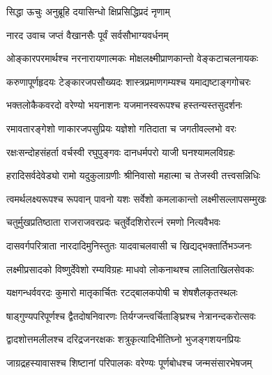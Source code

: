 

सिद्धा  ऊचुः\nopagebreak[4]
{अनुब्रूहि  दयासिन्धो  क्षिप्रसिद्धिप्रदं  नृणाम्}

नारद  उवाच
{जप्तं  वैखानसैः  पूर्वं  सर्वसौभाग्यवर्धनम्}

\twolineshloka
{ओङ्कारपरमार्थश्च  नरनारायणात्मकः}
{मोक्षलक्ष्मीप्राणकान्तो वेङ्कटाचलनायकः}

\twolineshloka
{करुणापूर्णहृदयः टेङ्कारजपसौख्यदः}
{शास्त्रप्रमाणगम्यश्च यमाद्यष्टाङ्गगोचरः}
    
\twolineshloka
{भक्तलोकैकवरदो वरेण्यो भयनाशनः}
{यजमानस्वरूपश्च हस्तन्यस्तसुदर्शनः}
        
\twolineshloka
{रमावतारङ्गेशो णाकारजपसुप्रियः}
{यज्ञेशो गतिदाता च जगतीवल्लभो वरः}
            
\twolineshloka
{रक्षःसन्दोहसंहर्ता वर्चस्वी रघुपुङ्गवः}
{दानधर्मपरो याजी घनश्यामलविग्रहः}
                
\twolineshloka
{हरादिसर्वदेवेड्यो रामो यदुकुलाग्रणीः}
{श्रीनिवासो महात्मा च तेजस्वी तत्त्वसन्निधिः}
                    
\twolineshloka
{त्वमर्थलक्ष्यरूपश्च रूपवान् पावनो यशः}
{सर्वेशो कमलाकान्तो लक्ष्मीसल्लापसम्मुखः}
                        
\twolineshloka
{चतुर्मुखप्रतिष्ठाता राजराजवरप्रदः}
{चतुर्वेदशिरोरत्नं रमणो नित्यवैभवः }
                            
\twolineshloka
{दासवर्गपरित्राता नारदादिमुनिस्तुतः}
{यादवाचलवासी च खिद्यद्भक्तार्तिभञ्जनः }
                                
\twolineshloka
{लक्ष्मीप्रसादको विष्णुर्देवेशो रम्यविग्रहः}
{माधवो लोकनाथश्च लालिताखिलसेवकः }
                                    
\twolineshloka
{यक्षगन्धर्ववरदः कुमारो मातृकार्चितः}
{रटद्बालकपोषी च शेषशैलकृतस्थलः }
                                        
\twolineshloka
{षाड्गुण्यपरिपूर्णश्च द्वैतदोषनिवारणः}
{तिर्यग्जन्त्वर्चिताङ्घ्रिश्च नेत्रानन्दकरोत्सवः }
                                            
\twolineshloka
{द्वादशोत्तमलीलश्च दरिद्रजनरक्षकः}
{शत्रुकृत्यादिभीतिघ्नो भुजङ्गशयनप्रियः}
                                                
\twolineshloka
{जाग्रद्रहस्यावासश्च शिष्टानां  परिपालकः}
{वरेण्यः पूर्णबोधश्च जन्मसंसारभेषजम् }
                                                    
